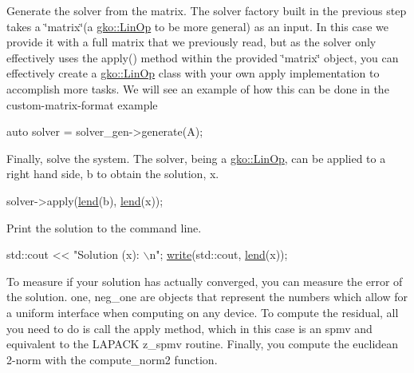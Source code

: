 Generate the solver from the matrix. The solver factory built in the previous step takes a \char`\"{}matrix\char`\"{}(a \hyperlink{classgko_1_1LinOp}{gko\+::\+Lin\+Op} to be more general) as an input. In this case we provide it with a full matrix that we previously read, but as the solver only effectively uses the apply() method within the provided \char`\"{}matrix\char`\"{} object, you can effectively create a \hyperlink{classgko_1_1LinOp}{gko\+::\+Lin\+Op} class with your own apply implementation to accomplish more tasks. We will see an example of how this can be done in the custom-\/matrix-\/format example


\begin{DoxyCode}
\textcolor{keyword}{auto} solver = solver\_gen->generate(A);
\end{DoxyCode}


Finally, solve the system. The solver, being a \hyperlink{classgko_1_1LinOp}{gko\+::\+Lin\+Op}, can be applied to a right hand side, b to obtain the solution, x.


\begin{DoxyCode}
solver->apply(\hyperlink{namespacegko_aa8cb4876b72e5e1036ea9575443c439b}{lend}(b), \hyperlink{namespacegko_aa8cb4876b72e5e1036ea9575443c439b}{lend}(x));
\end{DoxyCode}


Print the solution to the command line.


\begin{DoxyCode}
std::cout << \textcolor{stringliteral}{"Solution (x): \(\backslash\)n"};
\hyperlink{namespacegko_a859dc47a462721d83728d91ab7fa2148}{write}(std::cout, \hyperlink{namespacegko_aa8cb4876b72e5e1036ea9575443c439b}{lend}(x));
\end{DoxyCode}


To measure if your solution has actually converged, you can measure the error of the solution. one, neg\+\_\+one are objects that represent the numbers which allow for a uniform interface when computing on any device. To compute the residual, all you need to do is call the apply method, which in this case is an spmv and equivalent to the L\+A\+P\+A\+CK z\+\_\+spmv routine. Finally, you compute the euclidean 2-\/norm with the compute\+\_\+norm2 function.


